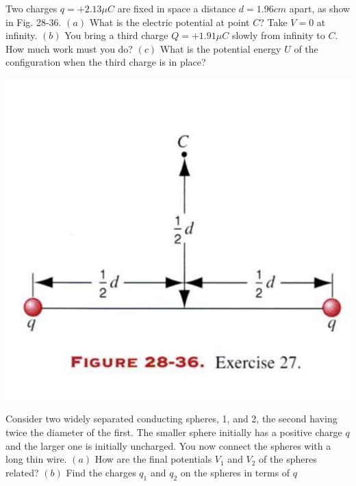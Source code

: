 \documentclass[11pt,letterpaper,boxed]{hmcpset}
\begin{document}
\begin{problem}[HRK P28.27	]
Two  charges  $q= +2.13 \mu C$ are fixed in space a distance $d= 1.96 cm$ apart, as show in Fig. 28-36. $(a)$ What is the electric potential at point $C$? Take $V= 0$ at infinity. $(b)$ You bring a third charge $Q = + 1.91 \mu C$ slowly from infinity to $C$. How much work must you do? $(c)$ What is the potential energy $U$ of the configuration when the third charge is in place?
\begin{center}
\includegraphics[scale=0.6]{28-36.png}
\end{center}
\end{problem}

\begin{solution}
\vfill
\end{solution}
\newpage

\begin{problem}[HRK P28.42]
Consider two widely separated conducting spheres, 1, and 2, the second having twice the diameter of the first. The smaller sphere initially has a positive charge $q$ and the larger one is initially uncharged. You now connect the spheres with a long  thin wire. $(a)$ How are the final potentials $V_1$ and $V_2$ of the spheres related? $(b)$ Find the charges $q_1$ and $q_2$ on the spheres in terms of $q$ 
\end{problem}

\begin{solution}
\vfill
\end{solution}
\newpage
\end{document}

